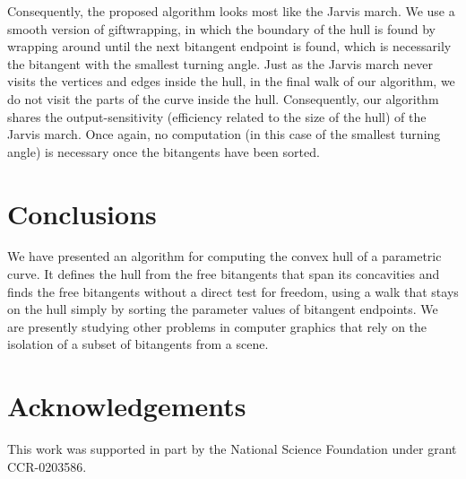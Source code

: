 \documentclass{sig-alternate}
\begin{document}
Consequently, the proposed algorithm looks most like the Jarvis march.
We use a smooth version of giftwrapping, in which 
the boundary of the hull is found by wrapping around until the next bitangent endpoint is found,
which is necessarily the bitangent with the smallest turning angle.
Just as the Jarvis march never visits the vertices and edges inside the hull,
in the final walk of our algorithm, we do not visit the parts of the curve inside the hull.
Consequently, our algorithm shares the output-sensitivity (efficiency 
related to the size of the hull) of the Jarvis march.
Once again, no computation (in this case of the smallest turning angle) is necessary
once the bitangents have been sorted.



\section{Conclusions}
\label{sec:conclusions}

We have presented an algorithm for computing the convex hull of a parametric curve.
It defines the hull from the free bitangents that span its concavities
and finds the free bitangents without a direct test for freedom, using a walk that
stays on the hull simply by sorting the parameter values of bitangent endpoints.
We are presently studying other problems in computer graphics that rely on the
isolation of a subset of bitangents from a scene.

\section{Acknowledgements}

This work was supported in part by the National Science Foundation under grant
CCR-0203586.
\end{document}
